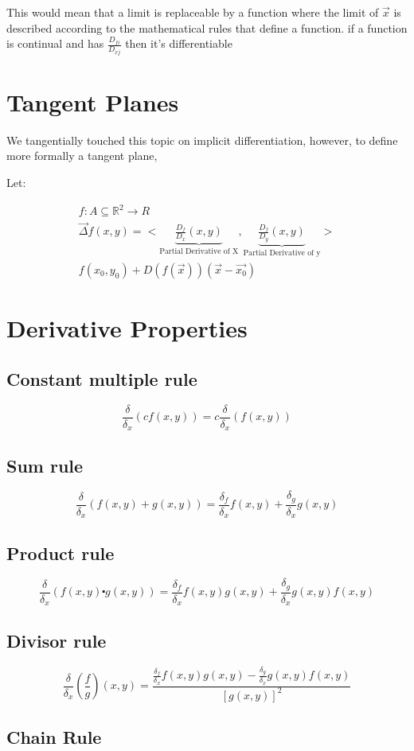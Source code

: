 \documentclass[11pt,fleqn]{book} %
\begin{document}
This would mean that a limit is replaceable by a function where the limit of $\vec{x}$ 
is described according to the mathematical rules that define a function. 
if a function is continual and has $\frac{D_{fi}}{D_{xj}}$ then it's differentiable


\section{Tangent Planes}
 We tangentially touched this topic on implicit differentiation, however, to define more 
 formally a tangent plane,
 
 Let:

 \begin{gather}
    f: A \subseteq \mathbb{R}^2 \to R \\
    \vec{\Delta} f (x,y) = < \underbrace{\frac{D_f}{D_x} (x,y)}_\text{Partial Derivative of X}, \underbrace{\frac{D_f}{D_y} (x,y)}_\text{Partial Derivative of y}> \\
    f(x_0, y_0) + D(f(\vec{x})) (\vec{x}-\vec{x_0})
 \end{gather}


\section{Derivative Properties}
\subsection{Constant multiple rule}
$$ \frac{\delta}{\delta_x}(c f(x,y)) = c \frac{\delta}{\delta_x}(f(x,y)) $$
\subsection{Sum rule}
$$\frac{\delta}{\delta_x}(f(x,y) + g(x,y)) = \frac{\delta_f}{\delta_x} f(x,y) + \frac{\delta_g}{\delta_x} g(x,y)$$
\subsection{Product rule}
$$\frac{\delta}{\delta_x}(f(x,y) \centerdot g(x,y)) = \frac{\delta_f}{\delta_x} f(x,y) g(x,y) + \frac{\delta_g}{\delta_x} g(x,y) f(x,y)$$
\subsection{Divisor rule}
$$\frac{\delta}{\delta_x}(\frac{f}{g})(x,y) = \frac{\frac{\delta_f}{\delta_x} f(x,y) g(x,y) - \frac{\delta_g}{\delta_x} g(x,y) f(x,y)}{[g(x,y)]^2}$$
\subsection{Chain Rule}
\end{document}

